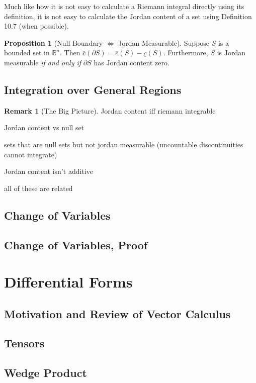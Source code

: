 \documentclass{article}
\newcommand{\R}{\mathbb{R}}
\theoremstyle{definition}
\newtheorem{proposition}{Proposition}[section]
\newtheorem{remark}{Remark}[section]
\begin{document}
	Much like how it is not easy to calculate a Riemann integral directly using its definition, it is not easy to calculate the Jordan content of a set using Definition 10.7  (when possible).  
	
	\begin{proposition}[Null Boundary $ \iff $ Jordan Measurable]
		Suppose $ S $ is a bounded set in $ \R^n $. Then $ \bar c(\partial S) = \bar c(S)-\underline c(S) $. Furthermore, $ S $ is Jordan measurable \textit{if and only if} $ \partial S $ has Jordan content zero.
	\end{proposition}

	
	
	\subsection{Integration over General Regions}
	
	\begin{remark}[The Big Picture]
		Jordan content iff riemann integrable
		
		Jordan content vs null set
		
		sets that are null sets but not jordan measurable (uncountable discontinuities cannot integrate)
		
		Jordan content isn't additive 
		
		all of these are related
	\end{remark}
	\subsection{Change of Variables}
	\subsection{Change of Variables, Proof}
	\section{Differential Forms}
	\subsection{Motivation and Review of Vector Calculus}
	\subsection{Tensors}
	\subsection{Wedge Product}
\end{document}
